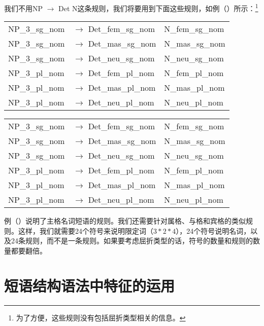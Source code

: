 我们不用NP $\to$ Det N这条规则，我们将要用到下面这些规则，如例（）所示：\footnote{%
为了方便，这些规则没有包括屈折类型相关的信息。
}  
\ea
\begin{tabular}[t]{@{}l@{ }l@{~~}l}
NP\_3\_sg\_nom  & $\to$ Det\_fem\_sg\_nom & N\_fem\_sg\_nom \\
NP\_3\_sg\_nom  & $\to$ Det\_mas\_sg\_nom & N\_mas\_sg\_nom \\
NP\_3\_sg\_nom  & $\to$ Det\_neu\_sg\_nom & N\_neu\_sg\_nom \\
NP\_3\_pl\_nom  & $\to$ Det\_fem\_pl\_nom & N\_fem\_pl\_nom \\
NP\_3\_pl\_nom  & $\to$ Det\_mas\_pl\_nom & N\_mas\_pl\_nom \\
NP\_3\_pl\_nom  & $\to$ Det\_neu\_pl\_nom & N\_neu\_pl\_nom \\[2mm]
\end{tabular}

\begin{tabular}[t]{@{}l@{ }l@{~~}l}
NP\_3\_sg\_nom  & $\to$ Det\_fem\_sg\_nom & N\_fem\_sg\_nom \\
NP\_3\_sg\_nom  & $\to$ Det\_mas\_sg\_nom & N\_mas\_sg\_nom \\
NP\_3\_sg\_nom  & $\to$ Det\_neu\_sg\_nom & N\_neu\_sg\_nom \\
NP\_3\_pl\_nom  & $\to$ Det\_fem\_pl\_nom & N\_fem\_pl\_nom \\
NP\_3\_pl\_nom  & $\to$ Det\_mas\_pl\_nom & N\_mas\_pl\_nom \\
NP\_3\_pl\_nom  & $\to$ Det\_neu\_pl\_nom & N\_neu\_pl\_nom \\[2mm]
\end{tabular}
\z
例（）说明了主格名词短语的规则。我们还需要针对属格、与格和宾格的类似规则。这样，我们就需要24个符号来说明限定词（$3*2*4$），24个符号说明名词，以及24条规则，而不是一条规则。如果要考虑屈折类型的话，符号的数量和规则的数量都要翻倍。

\section{短语结构语法中特征的运用}
\label{sec-PSG-Merkmale}

